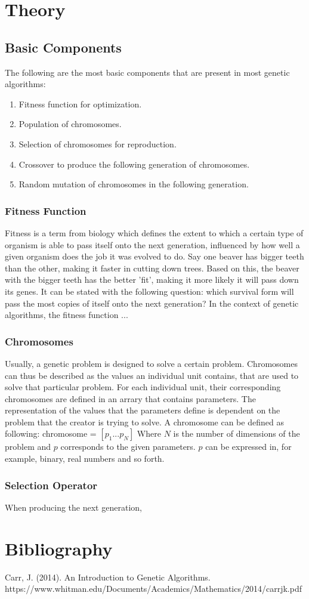 \documentclass{article}
\begin{document}
\section{Theory}
\subsection{Basic Components}
The following are the most basic components that are present in most genetic algorithms:
\begin{enumerate}
    \item Fitness function for optimization.
    \item Population of chromosomes.
    \item Selection of chromosomes for reproduction.
    \item Crossover to produce the following generation of chromosomes.
    \item Random mutation of chromosomes in the following generation.
\end{enumerate}
\bigbreak
\subsubsection{Fitness Function}
Fitness is a term from biology which defines the extent to which a certain type of organism is able to pass itself onto the next generation, influenced by how well a given organism does the job it was evolved to do. Say one beaver has bigger teeth than the other, making it faster in cutting down trees. Based on this, the beaver with the bigger teeth has the better 'fit', making it more likely it will pass down its genes. It can be stated with the following question: which survival form will pass the most copies of itself onto the next generation?\medbreak
In the context of genetic algorithms, the fitness function ...
\bigbreak
\subsubsection{Chromosomes}
Usually, a genetic problem is designed to solve a certain problem. Chromosomes can thus be described as the values an individual unit contains, that are used to solve that particular problem. For each individual unit, their corresponding chromosomes are defined in an arrary that contains parameters. The representation of the values that the parameters define is dependent on the problem that the creator is trying to solve. A chromosome can be defined as following:\smallbreak
chromosome = $\left[ p_{1} ... p_{N} \right]$\smallbreak
Where $N$ is the number of dimensions of the problem and $p$ corresponds to the given parameters. $p$ can be expressed in, for example, binary, real numbers and so forth.
\bigbreak
\subsubsection{Selection Operator}
When producing the next generation, 
\bigbreak

\newpage
\section{Bibliography}
Carr, J. (2014). An Introduction to Genetic Algorithms.\smallbreak
https://www.whitman.edu/Documents/Academics/Mathematics/2014/carrjk.pdf

‌
\end{document}
